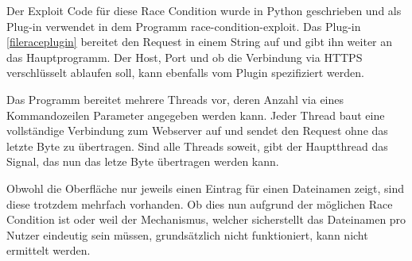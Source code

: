 \documentclass[12pt,DIV14,BCOR10mm,a4paper,parskip=half-,headsepline,headinclude,english,ngerman,bibliography=totocnumbered]{scrreprt}
\begin{document}
Der Exploit Code für diese Race Condition wurde in Python geschrieben und als Plug-in verwendet in dem Programm race-condition-exploit. Das Plug-in \ref{fileraceplugin} bereitet den Request in einem String auf und gibt ihn weiter an das Hauptprogramm. Der Host, Port und ob die Verbindung via HTTPS verschlüsselt ablaufen soll, kann ebenfalls vom Plugin spezifiziert werden.

Das Programm bereitet mehrere Threads vor, deren Anzahl via eines Kommandozeilen Parameter angegeben werden kann. Jeder Thread baut eine vollständige Verbindung zum Webserver auf und sendet den Request ohne das letzte Byte zu übertragen. Sind alle Threads soweit, gibt der Hauptthread das Signal, das nun das letze Byte übertragen werden kann.

Obwohl die Oberfläche nur jeweils einen Eintrag für einen Dateinamen zeigt, sind diese trotzdem mehrfach vorhanden. Ob dies nun aufgrund der möglichen Race Condition ist oder weil der Mechanismus, welcher sicherstellt das Dateinamen pro Nutzer eindeutig sein müssen, grundsätzlich nicht funktioniert, kann nicht ermittelt werden.

\printbibliography

\printacronyms[title=Abkürzungsverzeichnis,toctitle=Abkürzungsverzeichnis]
\printglossary[title=Glossar,toctitle=Glossar,type=main]

\iftotalfigures
  \listoffigures
\fi

\end{document}
